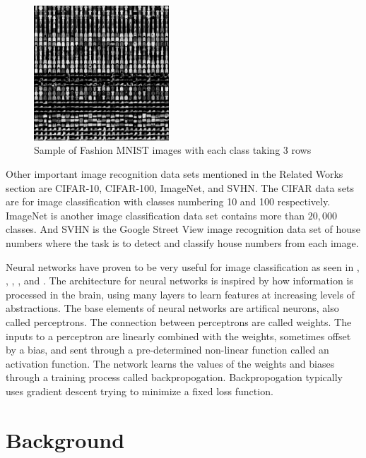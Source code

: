 \documentclass{IEEEtran}
\begin{document}
\begin{figure}
    \centering
    \includegraphics[width=0.45\textwidth]{fashion-mnist-sprite.png}
    \caption{Sample of Fashion MNIST images with each class taking 3 rows}
    \label{fig:sample}
\end{figure}

Other important image recognition data sets mentioned in the Related Works
section are CIFAR-10, CIFAR-100, ImageNet, and SVHN. The CIFAR data sets are
for image classification with classes numbering 10 and 100 respectively.
ImageNet is another image classification data set contains more than \(20,000\)
classes. And SVHN is the Google Street View image recognition data set of house
numbers where the task is to detect and classify house numbers from each image.

Neural networks have proven to be very useful for image classification as seen
in \cite{Zagoruyko_2016}, \cite{xie2019selftraining},
\cite{byerly2020branching}, \cite{sabour2017dynamic}, and
\cite{zhong2017random}. The architecture for neural networks is inspired by how
information is processed in the brain, using many layers to learn features at
increasing levels of abstractions. The base elements of neural networks are
artifical neurons, also called perceptrons. The connection between perceptrons
are called weights. The inputs to a perceptron are linearly combined with the
weights, sometimes offset by a bias, and sent through a pre-determined
non-linear function called an activation function. The network learns the values
of the weights and biases through a training process called backpropogation.
Backpropogation typically uses gradient descent trying to minimize a fixed loss
function.

\section{Background}
\end{document}
